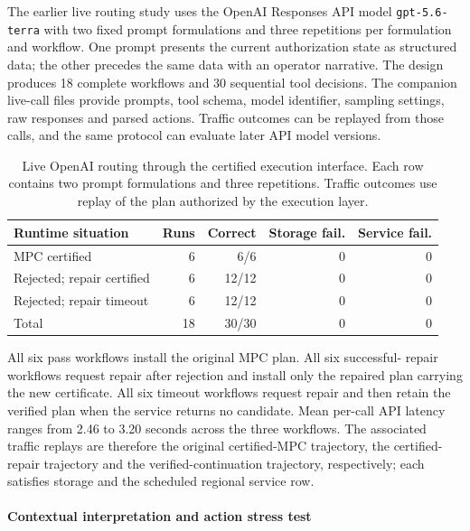 \documentclass[preprint,12pt]{elsarticle}
\numberwithin{equation}{section}
\begin{document}
The earlier live routing study uses the OpenAI Responses API model
\texttt{gpt-5.6-terra} with two fixed prompt formulations and three
repetitions per formulation and workflow. One prompt presents the current
authorization state as structured data; the other precedes the same data
with an operator narrative. The design produces 18 complete workflows and
30 sequential tool decisions. The companion live-call files provide prompts, tool schema, model
identifier, sampling settings, raw responses and parsed actions.
Traffic outcomes can be replayed from those calls, and the same
protocol can evaluate later API model versions.

\begin{table}[t]
\centering\footnotesize
\caption{Live OpenAI routing through the certified execution interface.
Each row contains two prompt formulations and three repetitions. Traffic
outcomes use replay of the plan authorized by the execution
layer.}
\label{tab:task-state-live}
\setlength{\tabcolsep}{3pt}
\begin{tabular}{@{}lrrrr@{}}
\toprule
Runtime situation & Runs & Correct & Storage fail. & Service fail.\\
\midrule
MPC certified & 6 & 6/6 & 0 & 0\\
Rejected; repair certified & 6 & 12/12 & 0 & 0\\
Rejected; repair timeout & 6 & 12/12 & 0 & 0\\
\midrule
Total & 18 & 30/30 & 0 & 0\\
\bottomrule
\end{tabular}
\end{table}

All six pass workflows install the original MPC plan. All six successful-
repair workflows request repair after rejection and install only the repaired
plan carrying the new certificate. All six timeout workflows request repair
and then retain the verified plan when the service returns no candidate.
Mean per-call API latency
ranges from 2.46 to 3.20 seconds across the three workflows. The associated
traffic replays are therefore the original certified-MPC trajectory, the
certified-repair trajectory and the verified-continuation trajectory,
respectively; each satisfies storage and the scheduled regional service row.

\paragraph{Contextual interpretation and action stress test}
\end{document}
